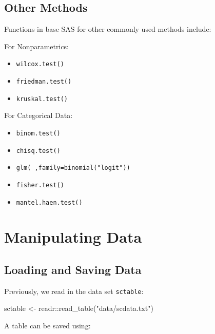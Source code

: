 \documentclass[
]{book}
\newenvironment{Shaded}{\begin{snugshade}}{\end{snugshade}}
\newcommand{\FunctionTok}[1]{\textcolor[rgb]{0.00,0.00,0.00}{#1}}
\newcommand{\NormalTok}[1]{#1}
\newcommand{\OtherTok}[1]{\textcolor[rgb]{0.56,0.35,0.01}{#1}}
\newcommand{\SpecialCharTok}[1]{\textcolor[rgb]{0.00,0.00,0.00}{#1}}
\newcommand{\StringTok}[1]{\textcolor[rgb]{0.31,0.60,0.02}{#1}}
\providecommand{\tightlist}{%
  \setlength{\itemsep}{0pt}\setlength{\parskip}{0pt}}
\begin{document}
\hypertarget{other-methods}{%
\section{Other Methods}\label{other-methods}}

Functions in base SAS for other commonly used methods include:

For Nonparametrics:

\begin{itemize}
\tightlist
\item
  \texttt{wilcox.test()}
\item
  \texttt{friedman.test()}
\item
  \texttt{kruskal.test()}
\end{itemize}

For Categorical Data:

\begin{itemize}
\tightlist
\item
  \texttt{binom.test()}
\item
  \texttt{chisq.test()}
\item
  \texttt{glm(\ ,family=binomial("logit"))}
\item
  \texttt{fisher.test()}
\item
  \texttt{mantel.haen.test()}
\end{itemize}

\hypertarget{manipulating-data}{%
\chapter{Manipulating Data}\label{manipulating-data}}

\hypertarget{loading-and-saving-data}{%
\section{Loading and Saving Data}\label{loading-and-saving-data}}

Previously, we read in the data set \texttt{sctable}:

\begin{Shaded}
\begin{Highlighting}[]
\NormalTok{sctable }\OtherTok{\textless{}{-}}\NormalTok{ readr}\SpecialCharTok{::}\FunctionTok{read\_table}\NormalTok{(}\StringTok{"data/scdata.txt"}\NormalTok{)}
\end{Highlighting}
\end{Shaded}

A table can be saved using:
\end{document}
